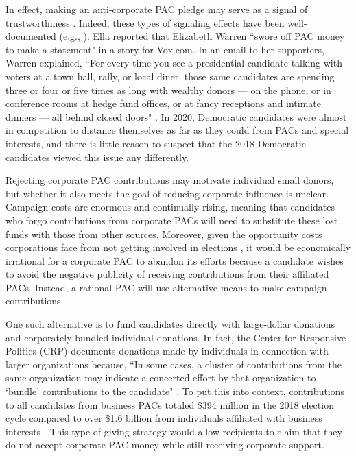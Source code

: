 \documentclass[12pt]{article}
\begin{document}
In effect, making an anti-corporate PAC pledge may serve as a signal of trustworthiness \citep{jenkinse}. Indeed, these types of signaling effects have been well-documented (e.g., \cite{iyengar1989}). Ella \citet{nilsen2019} reported that Elizabeth Warren ``swore off PAC money to make a statement" in a story for Vox.com. In an email to her supporters, Warren explained, ``For every time you see a presidential candidate talking with voters at a town hall, rally, or local diner, those same candidates are spending three or four or five times as long with wealthy donors — on the phone, or in conference rooms at hedge fund offices, or at fancy receptions and intimate dinners — all behind closed doors" \citep{nilsen2019}. In 2020, Democratic candidates were almost in competition to distance themselves as far as they could from PACs and special interests, and there is little reason to suspect that the 2018 Democratic candidates viewed this issue any differently. 

Rejecting corporate PAC contributions may motivate individual small donors, but whether it also meets the goal of reducing corporate influence is unclear. Campaign costs are enormous and continually rising, meaning that candidates who forgo contributions from corporate PACs will need to substitute these lost funds with those from other sources. Moreover, given the opportunity costs corporations face from not getting involved in elections \citep{denzau1986, kroszner1998}, it would be economically irrational for a corporate PAC to abandon its efforts because a candidate wishes to avoid the negative publicity of receiving contributions from their affiliated PACs. Instead, a rational PAC will use alternative means to make campaign contributions. 

One such alternative is to fund candidates directly with large-dollar donations and corporately-bundled individual donations. In fact, the Center for Responsive Politics (CRP) documents donations made by individuals in connection with larger organizations because, ``In some cases, a cluster of contributions from the same organization may indicate a concerted effort by that organization to `bundle' contributions to the candidate" \citep{opensecrets.orgn.d.}. To put this into context, contributions to all candidates from business PACs totaled \$394 million in the 2018 election cycle compared to over \$1.6 billion from individuals affiliated with business interests \citep{opensecrets.org2021}. This type of giving strategy would allow recipients to claim that they do not accept corporate PAC money while still receiving corporate support. 
\end{document}
